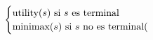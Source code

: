 \documentclass[preview]{standalone}
\begin{document}
\begin{align*}
\begin{cases}\text{utility($s$) si $s$ es terminal} \cr
                                 \text{minimax($s$) si $s$ no es terminal}( \cr
                                 \end{cases}
\end{align*}
\end{document}
